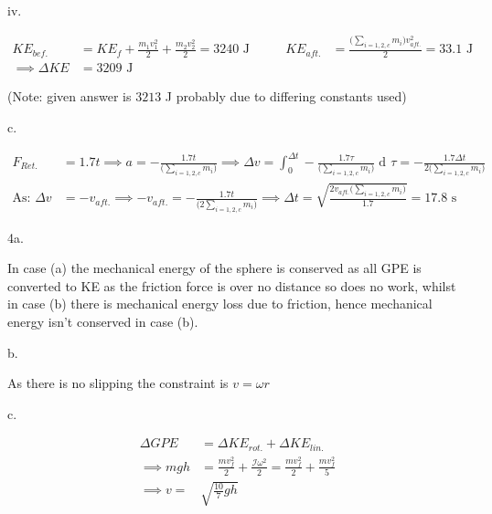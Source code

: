 \documentclass[12pt]{article}
\DeclareMathOperator{\di}{d\!}
\begin{document}
    iv.

    \begin{equation*}
        \begin{alignedat}{2}
            KE_{bef.}&=KE_f+\frac{m_1v_1^2}{2}+\frac{m_2v_2^2}{2}=3240\text{ J}\quad&\quad KE_{aft.}&=\frac{\big(\sum_{i=1,2,c}m_i\big)v_{aft.}^2}{2}=33.1\text{ J}\\
            \implies \Delta KE&=3209\text{ J}
        \end{alignedat}
    \end{equation*}
    
    (Note: given answer is $3213$ J probably due to differing constants used)

    c.

    \begin{equation*}
        \begin{alignedat}{1}
            F_{Ret.}&=1.7t\implies a=-\frac{1.7t}{\big(\sum_{i=1,2,c}m_i\big)}\implies \Delta v=\int_0^{\Delta t}-\frac{1.7\tau}{\big(\sum_{i=1,2,c}m_i\big)}\di \tau=-\frac{1.7\Delta t}{2\big(\sum_{i=1,2,c}m_i\big)}\\
            \text{As: }\Delta v&=-v_{aft.}\implies-v_{aft.}=-\frac{1.7t}{\big(2\sum_{i=1,2,c}m_i\big)}\implies \Delta t=\sqrt{\frac{2v_{aft.}\big(\sum_{i=1,2,c}m_i\big)}{1.7}}=17.8\text{ s}
        \end{alignedat}
    \end{equation*}

    4a.
    
    In case (a) the mechanical energy of the sphere is conserved as all GPE is converted to KE as the friction force is over no distance so does no work, whilst in case (b) there is mechanical energy loss due to friction, hence mechanical energy isn't conserved in case (b).

    b.

    As there is no slipping the constraint is $v=\omega r$

    c.

    \begin{equation*}
        \begin{alignedat}{1}
            \Delta GPE&=\Delta KE_{rot.}+\Delta KE_{lin.}\\
            \implies mgh&=\frac{mv_f^2}{2}+\frac{\mathcal{I}\omega^2}{2}=\frac{mv_f^2}{2}+\frac{mv_f^2}{5}\\
            \implies v=&\sqrt{\frac{10}{7}gh}
        \end{alignedat}
    \end{equation*}
   
\end{document}
